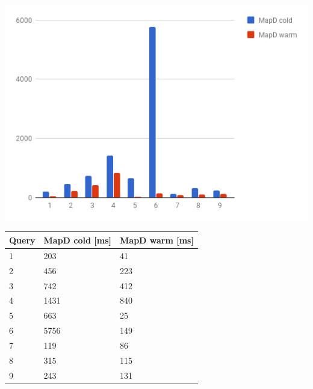   \begin{minipage}{\textwidth}
  \begin{minipage}[b]{0.59\textwidth}
    \centering
     \includegraphics[width=1.0\textwidth,height=1.0\textheight,keepaspectratio]{images/mapd_cold_vs_warm.png}
    \label{fig:mapd_cold_vs_warm}
  \end{minipage}
  \hfill
  \begin{minipage}[b]{0.39\textwidth}
    \centering
  \begin{tabular}{ |p{1cm}|p{2cm}|p{2cm}| }
    \hline
    Query & MapD cold [ms] & MapD warm [ms]\\
    \hline
    1 & 203 & 41 \\
    2 & 456 & 223 \\
    3 & 742 & 412 \\
    4 & 1431 & 840 \\
    5 & 663 & 25 \\
    6 & 5756 & 149 \\
    7 & 119 & 86 \\
    8 & 315 & 115 \\
    9 & 243 & 131 \\
    \hline
\end{tabular}
            \label{tab:mapd_cold_vs_warm}
    \end{minipage}
 \end{minipage}


